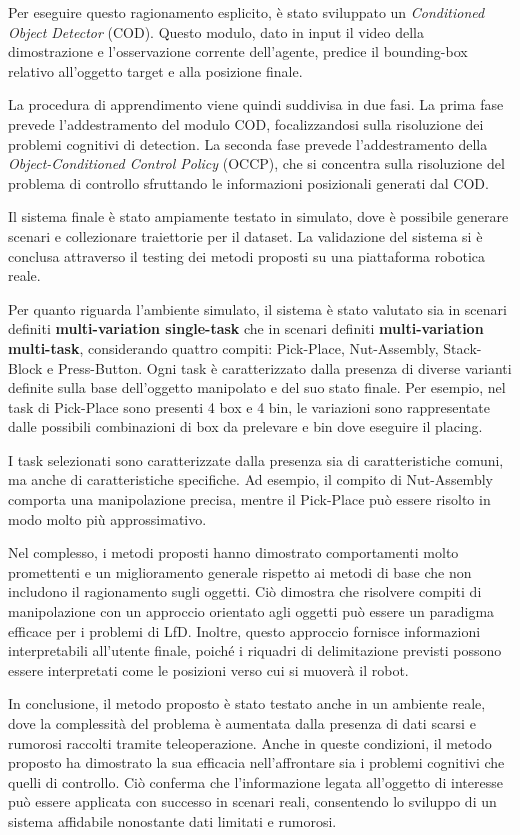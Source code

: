 Per eseguire questo ragionamento esplicito, è stato sviluppato un \textit{Conditioned Object Detector} (COD). Questo modulo, dato in input il video della dimostrazione e l'osservazione corrente dell'agente, predice il bounding-box relativo all'oggetto target e alla posizione finale.

La procedura di apprendimento viene quindi suddivisa in due fasi. La prima fase prevede l'addestramento del modulo COD, focalizzandosi sulla risoluzione dei problemi cognitivi di detection. La seconda fase prevede l'addestramento della \textit{Object-Conditioned Control Policy} (OCCP), che si concentra sulla risoluzione del problema di controllo sfruttando le informazioni posizionali generati dal COD.

Il sistema finale è stato ampiamente testato in simulato, dove è possibile generare scenari e collezionare traiettorie per il dataset. La validazione del sistema si è conclusa attraverso il testing dei metodi proposti su una piattaforma robotica reale. 

Per quanto riguarda l'ambiente simulato, il sistema è stato valutato sia in scenari definiti \textbf{multi-variation single-task} che in scenari definiti \textbf{multi-variation multi-task}, considerando quattro compiti: Pick-Place, Nut-Assembly, Stack-Block e Press-Button. Ogni task è caratterizzato dalla presenza di diverse varianti definite sulla base dell'oggetto manipolato e del suo stato finale. Per esempio, nel task di Pick-Place sono presenti 4 box e 4 bin, le variazioni sono rappresentate dalle possibili combinazioni di box da prelevare e bin dove eseguire il placing. 

I task selezionati sono caratterizzate dalla presenza sia di caratteristiche comuni, ma anche di caratteristiche specifiche. Ad esempio, il compito di Nut-Assembly comporta una manipolazione precisa, mentre il Pick-Place può essere risolto in modo molto più approssimativo.

Nel complesso, i metodi proposti hanno dimostrato comportamenti molto promettenti e un miglioramento generale rispetto ai metodi di base che non includono il ragionamento sugli oggetti. Ciò dimostra che risolvere compiti di manipolazione con un approccio orientato agli oggetti può essere un paradigma efficace per i problemi di LfD. Inoltre, questo approccio fornisce informazioni interpretabili all'utente finale, poiché i riquadri di delimitazione previsti possono essere interpretati come le posizioni verso cui si muoverà il robot.

In conclusione, il metodo proposto è stato testato anche in un ambiente reale, dove la complessità del problema è aumentata dalla presenza di dati scarsi e rumorosi raccolti tramite teleoperazione. Anche in queste condizioni, il metodo proposto ha dimostrato la sua efficacia nell'affrontare sia i problemi cognitivi che quelli di controllo. Ciò conferma che l'informazione legata all'oggetto di interesse può essere applicata con successo in scenari reali, consentendo lo sviluppo di un sistema affidabile nonostante dati limitati e rumorosi.
